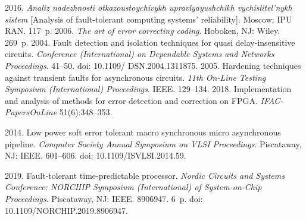   \begin{multicols}{2}

\renewcommand{\bibname}{\protect\rmfamily References}

{\small\frenchspacing
 {%
 \begin{thebibliography}{99}
 2016. \textit{Analiz nadezhnosti 
otkazoustoychivykh upravlyayushchikh vychislitel'nykh sistem} [Analysis of fault-tolerant computing 
systems' reliability]. Moscow: IPU RAN. 117~p.
 2006. \textit{The art of error correcting coding}. Hoboken, NJ: Wiley. 
269~p.
 2004. Fault detection and isolation techniques for quasi  
delay-insensitive circuits. \textit{Conference (International) on Dependable Systems and Networks 
Proceedings}. 41--50. doi: 10.1109/ DSN.2004.1311875.
 2005. Hardening techniques against transient faults 
for asynchronous circuits. \textit{11th On-Line Testing Symposium (International) Proceedings}. IEEE. 
129--134.
 2018. Implementation and analysis of methods for error 
detection and correction on FPGA. \textit{IFAC-PapersOnLine} 51(6):348--353.

 2014. Low power soft error tolerant macro 
synchronous micro asynchronous pipeline. \textit{Computer Society Annual Symposium on VLSI 
Proceedings}. Piscataway, NJ: IEEE. 601--606. doi: 10.1109/ISVLSI.2014.59.

 2019. Fault-tolerant time-predictable processor. \textit{Nordic 
Circuits and Systems Conference: NORCHIP  Symposium (International) of System-on-Chip 
Proceedings}. Piscataway, NJ: IEEE. 8906947. 6~p. doi: 10.1109/NORCHIP.2019.8906947.


\end{thebibliography}}}
\end{multicols}

